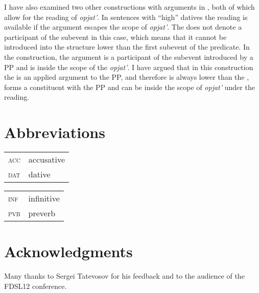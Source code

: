 \documentclass[output=paper]{langscibook}
\begin{document}
I have also examined two other constructions with  arguments in , both of which allow for the  reading of \textit{opjat’}. In sentences with “high” datives the  reading is available if the  argument escapes the scope of \textit{opjat’}. The  does not denote a participant of the  subevent in this case, which means that it cannot be introduced into the structure lower than the first subevent of the predicate. In the   construction, the  argument is a participant of the subevent introduced by a PP and is inside the scope of the  \textit{opjat’}. I have argued that in this construction the  is an applied argument to the PP, and therefore is always lower than the , forms a constituent with the PP and can be inside the scope of \textit{opjat’} under the  reading.

\section*{Abbreviations}

\begin{tabularx}{.5\textwidth}{@{}lQ@{}}
\textsc{acc}&{accusative}\\
\textsc{dat}&{dative}\\
\end{tabularx}%
\begin{tabularx}{.5\textwidth}{@{}lQ@{}}
\textsc{inf}&{infinitive}\\
\textsc{pvb}&preverb\\
\end{tabularx}

\section*{Acknowledgments}
Many thanks to Sergei Tatevosov for his feedback and to the audience of the FDSL12 conference.

\sloppy
\printbibliography[heading=subbibliography,notkeyword=this]
\end{document}
